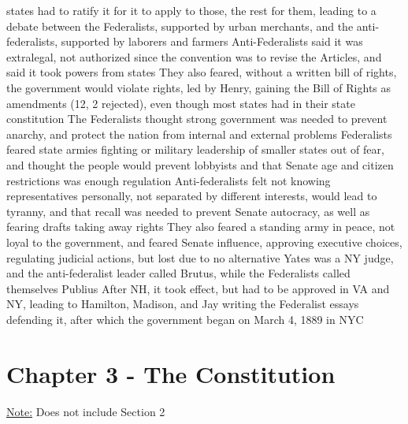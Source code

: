 \documentclass[11 pt, twoside]{article}
\newenvironment{outline*}
{
	\begin{outline}[enumerate]
	}
	{\end{outline}
}
\begin{document}
\begin{outline*}
 states had to ratify it for it to apply to those, the rest for them, leading to a debate between the Federalists, supported by urban merchants, and the anti-federalists, supported by laborers and farmers
\2 Anti-Federalists said it was extralegal, not authorized since the convention was to revise the Articles, and said it took powers from states
\2 They also feared, without a written bill of rights, the government would violate rights, led by Henry, gaining the Bill of Rights as amendments (12, 2 rejected), even though most states had in their state constitution
\2 The Federalists thought strong government was needed to prevent anarchy, and protect the nation from internal and external problems
\1 Federalists feared state armies fighting or military leadership of smaller states out of fear, and thought the people would prevent lobbyists and that Senate age and citizen restrictions was enough regulation
\2 Anti-federalists felt not knowing representatives personally, not separated by different interests, would lead to tyranny, and that recall was needed to prevent Senate autocracy, as well as fearing drafts taking away rights
\2 They also feared a standing army in peace, not loyal to the government, and feared Senate influence, approving executive choices, regulating judicial actions, but lost due to no alternative
\2 Yates was a NY judge, and the anti-federalist leader called Brutus, while the Federalists called themselves Publius
\1 After NH, it took effect, but had to be approved in VA and NY, leading to Hamilton, Madison, and Jay writing the Federalist essays defending it, after which the government began on March 4, 1889 in NYC
\end{outline*}
\section{Chapter 3 - The Constitution}
\underline{Note:} Does not include Section 2
\end{document}
